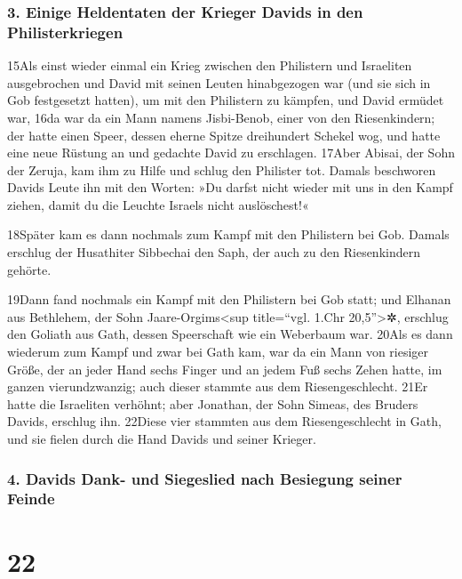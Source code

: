 \hypertarget{einige-heldentaten-der-krieger-davids-in-den-philisterkriegen}{%
\subsubsection{3. Einige Heldentaten der Krieger Davids in den
Philisterkriegen}\label{einige-heldentaten-der-krieger-davids-in-den-philisterkriegen}}

15Als einst wieder einmal ein Krieg zwischen den Philistern und
Israeliten ausgebrochen und David mit seinen Leuten hinabgezogen war
(und sie sich in Gob festgesetzt hatten), um mit den Philistern zu
kämpfen, und David ermüdet war, 16da war da ein Mann namens Jisbi-Benob,
einer von den Riesenkindern; der hatte einen Speer, dessen eherne Spitze
dreihundert Schekel wog, und hatte eine neue Rüstung an und gedachte
David zu erschlagen. 17Aber Abisai, der Sohn der Zeruja, kam ihm zu
Hilfe und schlug den Philister tot. Damals beschworen Davids Leute ihn
mit den Worten: »Du darfst nicht wieder mit uns in den Kampf ziehen,
damit du die Leuchte Israels nicht auslöschest!«

18Später kam es dann nochmals zum Kampf mit den Philistern bei Gob.
Damals erschlug der Husathiter Sibbechai den Saph, der auch zu den
Riesenkindern gehörte.

19Dann fand nochmals ein Kampf mit den Philistern bei Gob statt; und
Elhanan aus Bethlehem, der Sohn Jaare-Orgims\textless sup title=``vgl.
1.Chr 20,5''\textgreater✲, erschlug den Goliath aus Gath, dessen
Speerschaft wie ein Weberbaum war. 20Als es dann wiederum zum Kampf und
zwar bei Gath kam, war da ein Mann von riesiger Größe, der an jeder Hand
sechs Finger und an jedem Fuß sechs Zehen hatte, im ganzen
vierundzwanzig; auch dieser stammte aus dem Riesengeschlecht. 21Er hatte
die Israeliten verhöhnt; aber Jonathan, der Sohn Simeas, des Bruders
Davids, erschlug ihn. 22Diese vier stammten aus dem Riesengeschlecht in
Gath, und sie fielen durch die Hand Davids und seiner Krieger.

\hypertarget{davids-dank--und-siegeslied-nach-besiegung-seiner-feinde}{%
\subsubsection{4. Davids Dank- und Siegeslied nach Besiegung seiner
Feinde}\label{davids-dank--und-siegeslied-nach-besiegung-seiner-feinde}}

\hypertarget{section-21}{%
\section{22}\label{section-21}}

